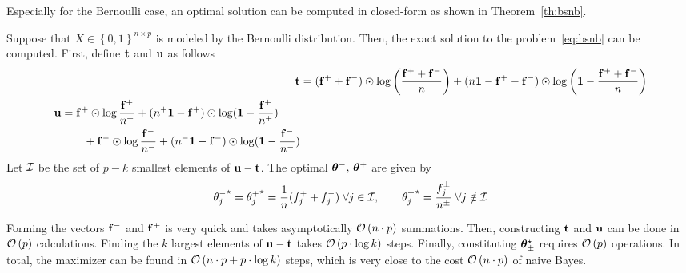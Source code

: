 Especially for the Bernoulli case,
an optimal solution can be computed in closed-form as shown in Theorem~\ref{th:bsnb}.
\begin{theorem}\label{th:bsnb}
Suppose that $X \in \left\{ 0, 1 \right\}^{n \times p}$ is modeled by the Bernoulli distribution.
Then, the exact solution to the problem~\ref{eq:bsnb} can be computed.
First, define $\mathbf{t}$ and $\mathbf{u}$ as follows
\begin{align*}
    \mathbf{t} &= (\mathbf{f}^+ + \mathbf{f}^-) \odot \log\left( \frac{\mathbf{f}^+ + \mathbf{f}^-}{n} \right)
    + (n\mathbf{1} - \mathbf{f}^+ - \mathbf{f}^-) \odot \log\left( \mathbf{1} - \frac{\mathbf{f}^+ + \mathbf{f}^-}{n} \right)\\
    \begin{split}
        \mathbf{u} &= \mathbf{f}^+ \odot \log \frac{\mathbf{f}^+}{n^+} + (n^+\mathbf{1} - \mathbf{f}^+) \odot \log (\mathbf{1} - \frac{\mathbf{f}^+}{n^+})\\
        &\qquad + \mathbf{f}^- \odot \log \frac{\mathbf{f}^-}{n^-} + (n^-\mathbf{1} - \mathbf{f}^-) \odot \log (\mathbf{1} - \frac{\mathbf{f}^-}{n^-})
    \end{split}
\end{align*}
Let $\mathcal{I}$ be the set of $p - k$ smallest elements of $\mathbf{u} - \mathbf{t}$.
The optimal $\bm{\theta}^-,\, \bm{\theta}^+$ are given by
\begin{equation*}
{\theta^-_j}^\star = {\theta^+_j}^\star = \frac{1}{n}(f_j^+ + f_j^-)
\;\forall j \in \mathcal{I}
,\qquad
{\theta^\pm_j}^\star = \frac{f^\pm_j}{n^\pm}
\;\forall j \notin \mathcal{I}
\end{equation*}
\end{theorem}
Forming the vectors $\mathbf{f}^-$ and $\mathbf{f}^+$ is very quick
and takes asymptotically $\mathcal{O}\left( n \cdot p \right)$ summations.
Then, constructing $\mathbf{t}$ and $\mathbf{u}$ can be done in $\mathcal{O}\left( p \right)$ calculations.
Finding the $k$ largest elements of $\mathbf{u} - \mathbf{t}$ takes $\mathcal{O}\left( p \cdot \log k \right)$ steps.
Finally, constituting $\bm{\theta}_\pm^\star$ requires $\mathcal{O}\left( p \right)$ operations.
In total, the maximizer can be found in $\mathcal{O}\left( n \cdot p + p \cdot \log k \right)$ steps,
which is very close to the cost $\mathcal{O}\left( n \cdot p \right)$ of naive Bayes.

